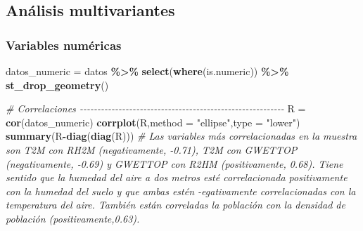 \documentclass[12pt,a4paper,]{book}
\newenvironment{Shaded}{\begin{snugshade}}{\end{snugshade}}
\newcommand{\AttributeTok}[1]{\textcolor[rgb]{0.13,0.29,0.53}{#1}}
\newcommand{\CommentTok}[1]{\textcolor[rgb]{0.56,0.35,0.01}{\textit{#1}}}
\newcommand{\FunctionTok}[1]{\textcolor[rgb]{0.13,0.29,0.53}{\textbf{#1}}}
\newcommand{\NormalTok}[1]{#1}
\newcommand{\OtherTok}[1]{\textcolor[rgb]{0.56,0.35,0.01}{#1}}
\newcommand{\SpecialCharTok}[1]{\textcolor[rgb]{0.81,0.36,0.00}{\textbf{#1}}}
\newcommand{\StringTok}[1]{\textcolor[rgb]{0.31,0.60,0.02}{#1}}
\numberwithin{dummy}{section}
\theoremstyle{ocrenumbox}
\theoremstyle{blacknumex}
\theoremstyle{blacknumbox}
\theoremstyle{ocrenum}
\theoremstyle{ocrenum}
\begin{document}
\hypertarget{anuxe1lisis-multivariantes}{%
\subsection{Análisis multivariantes}\label{anuxe1lisis-multivariantes}}

\hypertarget{variables-numuxe9ricas}{%
\subsubsection*{Variables numéricas}\label{variables-numuxe9ricas}}

\begin{Shaded}
\begin{Highlighting}[]
\NormalTok{datos\_numeric }\OtherTok{=}\NormalTok{ datos }\SpecialCharTok{\%\textgreater{}\%} 
  \FunctionTok{select}\NormalTok{(}\FunctionTok{where}\NormalTok{(is.numeric)) }\SpecialCharTok{\%\textgreater{}\%} 
  \FunctionTok{st\_drop\_geometry}\NormalTok{()}

\CommentTok{\# Correlaciones {-}{-}{-}{-}{-}{-}{-}{-}{-}{-}{-}{-}{-}{-}{-}{-}{-}{-}{-}{-}{-}{-}{-}{-}{-}{-}{-}{-}{-}{-}{-}{-}{-}{-}{-}{-}{-}{-}{-}{-}{-}{-}{-}{-}{-}{-}{-}{-}{-}{-}{-}{-}{-}{-}{-}{-}{-}{-}}
\NormalTok{R }\OtherTok{=} \FunctionTok{cor}\NormalTok{(datos\_numeric)}
\FunctionTok{corrplot}\NormalTok{(R,}\AttributeTok{method =} \StringTok{"ellipse"}\NormalTok{,}\AttributeTok{type =} \StringTok{"lower"}\NormalTok{)}
\FunctionTok{summary}\NormalTok{(R}\SpecialCharTok{{-}}\FunctionTok{diag}\NormalTok{(}\FunctionTok{diag}\NormalTok{(R)))}
\CommentTok{\# Las variables más correlacionadas en la muestra son T2M con RH2M (negativamente, {-}0.71), T2M con GWETTOP (negativamente, {-}0.69) y GWETTOP con R2HM (positivamente, 0.68). Tiene sentido que la humedad del aire a dos metros esté correlacionada positivamente con la humedad del suelo y que ambas estén {-}egativamente correlacionadas con la temperatura del aire. También están correladas la población con la densidad de población (positivamente,0.63).}



\end{Highlighting}
\end{Shaded}
\end{document}
